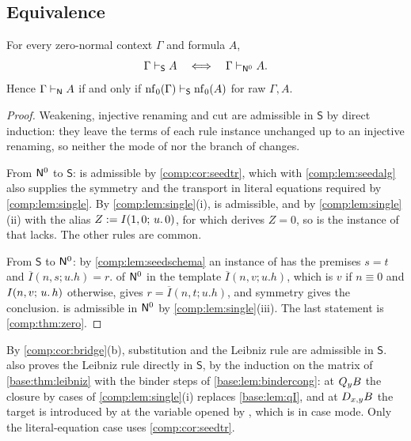\subsection{Equivalence}

\begin{theorem}
\label{comp:thm:seed}
For every zero-normal context $\Gamma$ and formula $A$,
\[
 \Gamma\vdash_{\mathsf S}A
 \quad\Longleftrightarrow\quad
 \Gamma\vdash_{\mathsf{N}^{0}}A .
\]
Hence $\Gamma\vdash_{\mathsf{N}}A$ if and only if
$\operatorname{nf}_0(\Gamma)\vdash_{\mathsf S}\operatorname{nf}_0(A)$ for raw $\Gamma,A$.
\end{theorem}

\begin{proof}
Weakening, injective renaming and cut are admissible in $\mathsf{S}$ by
direct induction: they leave the terms of each rule instance unchanged up
to an injective renaming, so neither the mode of  nor the
branch of  changes.

From $\mathsf{N}^{0}$ to $\mathsf{S}$:  is admissible by
\cref{comp:cor:seedtr}, which with \cref{comp:lem:seedalg} also supplies the
symmetry and the transport in literal equations required by
\cref{comp:lem:single}. By \cref{comp:lem:single}(i),  is
admissible, and by \cref{comp:lem:single}(ii) with the alias
$Z\mathrel{:=}I(1,0;\,u.\,0)$, for which  derives $Z=0$, so is the
instance of  that  lacks. The other rules are
common.

From $\mathsf{S}$ to $\mathsf{N}^{0}$: by \cref{comp:lem:seedschema} an instance
of  has the premises $s=t$ and
$\overline{I}(n,s;u.h)=r$.  of $\mathsf{N}^{0}$ in the template
$\overline{I}(n,v;u.h)$, which is $v$ if $n\equiv0$ and $I(n,v;\,u.\,h)$
otherwise, gives $r=\overline{I}(n,t;u.h)$, and symmetry gives the
conclusion.  is admissible in $\mathsf{N}^{0}$ by
\cref{comp:lem:single}(iii). The last statement is \cref{comp:thm:zero}.
\end{proof}

By \cref{comp:cor:bridge}(b), substitution and the Leibniz rule are
admissible in $\mathsf{S}$.  also proves the
Leibniz rule directly in $\mathsf{S}$, by the induction on the matrix of
\cref{base:thm:leibniz} with the binder steps of \cref{base:lem:bindercong}:
at $Q_{y}B$ the closure by cases of \cref{comp:lem:single}(i) replaces
\cref{base:lem:qI}, and at $D_{x,y}B$ the target is introduced by
 at the variable opened by , which is in case
mode. Only the literal-equation case uses \cref{comp:cor:seedtr}.

